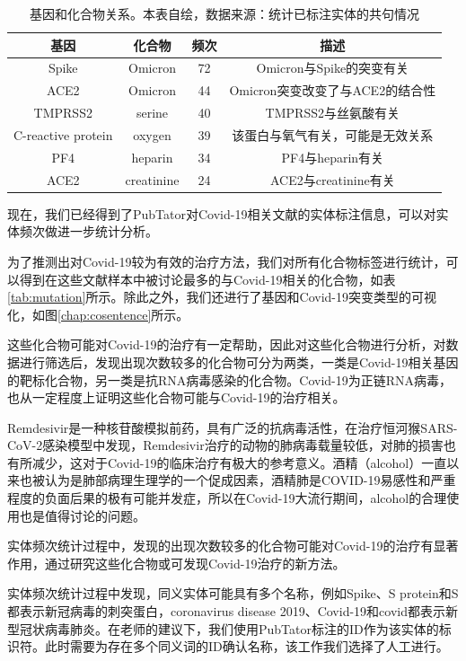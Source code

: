 \documentclass[twocolumn]{article}
\begin{document}
\begin{table}[ht!]
	\centering
	\caption{基因和化合物关系。本表自绘，数据来源：统计已标注实体的共句情况}
	\begin{tabular}{cccc}
		\hline
		基因 & 化合物 & 频次 & 描述\\
		\hline
		Spike & Omicron & 72 & Omicron与Spike的突变有关\\
		ACE2 & Omicron & 44 & Omicron突变改变了与ACE2的结合性\\
		TMPRSS2 & serine & 40 & TMPRSS2与丝氨酸有关\\
		C-reactive protein & oxygen & 39 & 该蛋白与氧气有关，可能是无效关系\\
		PF4 & heparin & 34 & PF4与heparin有关\\
		ACE2 & creatinine & 24 & ACE2与creatinine有关\\
		\hline
	\end{tabular}
	\label{tab:gene_mutation}
\end{table}

现在，我们已经得到了PubTator对Covid-19相关文献的实体标注信息，可以对实体频次做进一步统计分析。\par
为了推测出对Covid-19较为有效的治疗方法，我们对所有化合物标签进行统计，可以得到在这些文献样本中被讨论最多的与Covid-19相关的化合物，如表\ref{tab:mutation}所示。除此之外，我们还进行了基因和Covid-19突变类型的可视化，如图\ref{chap:cosentence}所示。\par
这些化合物可能对Covid-19的治疗有一定帮助，因此对这些化合物进行分析，对数据进行筛选后，发现出现次数较多的化合物可分为两类，一类是Covid-19相关基因的靶标化合物，另一类是抗RNA病毒感染的化合物。Covid-19为正链RNA病毒，也从一定程度上证明这些化合物可能与Covid-19的治疗相关。\par
Remdesivir是一种核苷酸模拟前药，具有广泛的抗病毒活性，在治疗恒河猴SARS-CoV-2感染模型中发现，Remdesivir治疗的动物的肺病毒载量较低，对肺的损害也有所减少\cite{PPR:PPR151409}，这对于Covid-19的临床治疗有极大的参考意义。酒精（alcohol）一直以来也被认为是肺部病理生理学的一个促成因素，酒精肺是COVID-19易感性和严重程度的负面后果的极有可能并发症\cite{BAILEY202111}，所以在Covid-19大流行期间，alcohol的合理使用也是值得讨论的问题。\par
实体频次统计过程中，发现的出现次数较多的化合物可能对Covid-19的治疗有显著作用，通过研究这些化合物或可发现Covid-19治疗的新方法。\par
实体频次统计过程中发现，同义实体可能具有多个名称，例如Spike、S protein和S都表示新冠病毒的刺突蛋白，coronavirus disease 2019、Covid-19和covid都表示新型冠状病毒肺炎。在老师的建议下，我们使用PubTator标注的ID作为该实体的标识符。此时需要为存在多个同义词的ID确认名称，该工作我们选择了人工进行。\par
\end{document}
